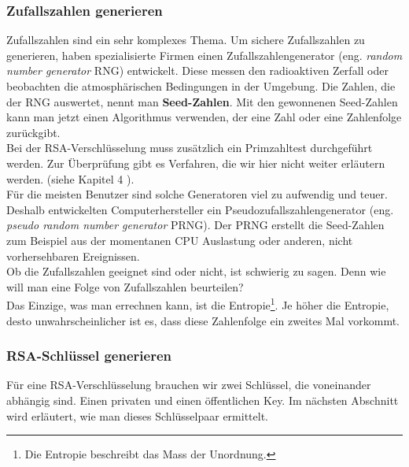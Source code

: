 \subsubsection{Zufallszahlen generieren}
Zufallszahlen sind ein sehr komplexes Thema. Um sichere Zufallszahlen zu generieren, haben spezialisierte Firmen einen Zufallszahlengenerator (eng. \textit{random number generator} RNG) entwickelt. Diese messen den radioaktiven Zerfall oder beobachten die atmosphärischen Bedingungen in der Umgebung. Die Zahlen, die der RNG auswertet, nennt man \textbf{Seed-Zahlen}. Mit den gewonnenen Seed-Zahlen kann man jetzt einen Algorithmus verwenden, der eine Zahl oder eine Zahlenfolge zurückgibt.\\
Bei der RSA-Verschlüsselung muss zusätzlich ein Primzahltest durchgeführt werden.
Zur Überprüfung gibt es Verfahren, die wir hier nicht weiter erläutern werden. (siehe Kapitel 4 \cite{rsa_and_public_key}).\\
%
Für die meisten Benutzer sind solche Generatoren viel zu aufwendig und teuer. Deshalb entwickelten Computerhersteller ein Pseudozufallszahlengenerator (eng. \textit{pseudo random number generator} PRNG). Der PRNG erstellt die Seed-Zahlen zum Beispiel aus der momentanen CPU Auslastung oder anderen, nicht vorhersehbaren Ereignissen.\\
Ob die Zufallszahlen geeignet sind oder nicht, ist schwierig zu sagen. Denn wie will man eine Folge von Zufallszahlen beurteilen?\\
Das Einzige, was man errechnen kann, ist die Entropie\footnote{Die Entropie beschreibt das Mass der Unordnung.}. Je höher die Entropie, desto unwahrscheinlicher ist es, dass diese Zahlenfolge ein zweites Mal vorkommt.
\subsubsection{RSA-Schlüssel generieren}
Für eine RSA-Verschlüsselung brauchen wir zwei Schlüssel, die voneinander abhängig sind. Einen privaten und einen öffentlichen Key. Im nächsten Abschnitt wird erläutert, wie man dieses Schlüsselpaar ermittelt.%
%
